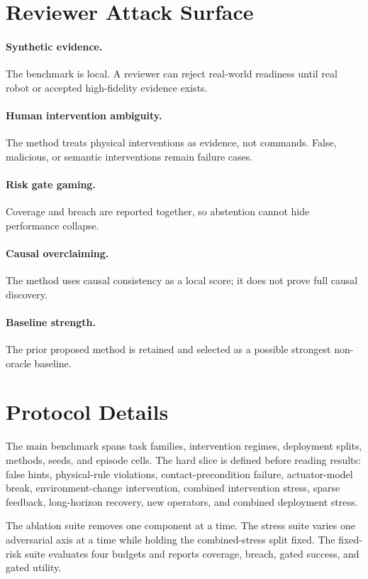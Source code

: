 \documentclass{article}
\begin{document}
\section{Reviewer Attack Surface}
\paragraph{Synthetic evidence.} The benchmark is local. A reviewer can reject real-world readiness until real robot or accepted high-fidelity evidence exists.
\paragraph{Human intervention ambiguity.} The method treats physical interventions as evidence, not commands. False, malicious, or semantic interventions remain failure cases.
\paragraph{Risk gate gaming.} Coverage and breach are reported together, so abstention cannot hide performance collapse.
\paragraph{Causal overclaiming.} The method uses causal consistency as a local score; it does not prove full causal discovery.
\paragraph{Baseline strength.} The prior proposed method is retained and selected as a possible strongest non-oracle baseline.

\clearpage
\section{Protocol Details}
The main benchmark spans task families, intervention regimes, deployment splits, methods, seeds, and episode cells. The hard slice is defined before reading results: false hints, physical-rule violations, contact-precondition failure, actuator-model break, environment-change intervention, combined intervention stress, sparse feedback, long-horizon recovery, new operators, and combined deployment stress.

The ablation suite removes one component at a time. The stress suite varies one adversarial axis at a time while holding the combined-stress split fixed. The fixed-risk suite evaluates four budgets and reports coverage, breach, gated success, and gated utility.
\end{document}

